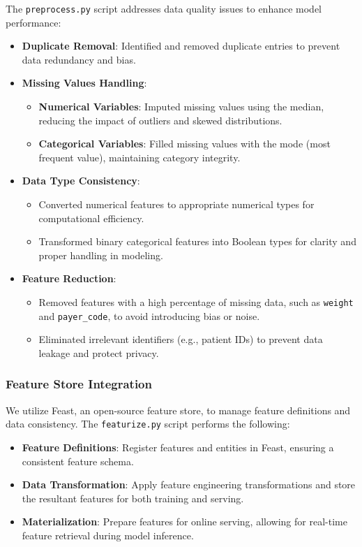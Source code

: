 \documentclass{article}
\begin{document}
The \texttt{preprocess.py} script addresses data quality issues to enhance model performance:

\begin{itemize}[leftmargin=*]
    \item \textbf{Duplicate Removal}: Identified and removed duplicate entries to prevent data redundancy and bias.
    \item \textbf{Missing Values Handling}:
        \begin{itemize}[leftmargin=*]
            \item \textbf{Numerical Variables}: Imputed missing values using the median, reducing the impact of outliers and skewed distributions.
            \item \textbf{Categorical Variables}: Filled missing values with the mode (most frequent value), maintaining category integrity.
        \end{itemize}
    \item \textbf{Data Type Consistency}:
        \begin{itemize}[leftmargin=*]
            \item Converted numerical features to appropriate numerical types for computational efficiency.
            \item Transformed binary categorical features into Boolean types for clarity and proper handling in modeling.
        \end{itemize}
    \item \textbf{Feature Reduction}:
        \begin{itemize}[leftmargin=*]
            \item Removed features with a high percentage of missing data, such as \texttt{weight} and \texttt{payer\_code}, to avoid introducing bias or noise.
            \item Eliminated irrelevant identifiers (e.g., patient IDs) to prevent data leakage and protect privacy.
        \end{itemize}
\end{itemize}

\subsubsection{Feature Store Integration}

We utilize Feast, an open-source feature store, to manage feature definitions and data consistency. The \texttt{featurize.py} script performs the following:

\begin{itemize}[leftmargin=*]
    \item \textbf{Feature Definitions}: Register features and entities in Feast, ensuring a consistent feature schema.
    \item \textbf{Data Transformation}: Apply feature engineering transformations and store the resultant features for both training and serving.
    \item \textbf{Materialization}: Prepare features for online serving, allowing for real-time feature retrieval during model inference.
\end{itemize}
\end{document}
